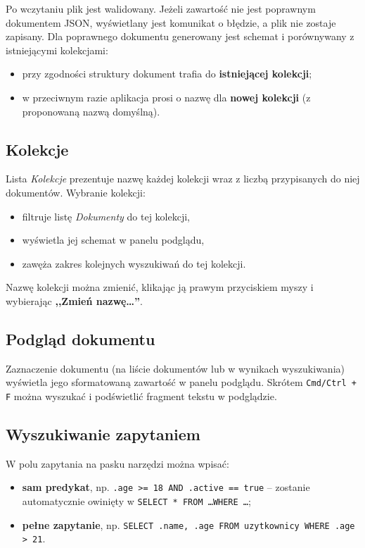 \documentclass[a4paper,12pt]{article}
\begin{document}
Po wczytaniu plik jest walidowany. Jeżeli zawartość nie jest poprawnym dokumentem JSON,
wyświetlany jest komunikat o błędzie, a plik nie zostaje zapisany. Dla poprawnego
dokumentu generowany jest schemat i porównywany z istniejącymi kolekcjami:

\begin{itemize}[noitemsep]
  \item przy zgodności struktury dokument trafia do \textbf{istniejącej kolekcji};
  \item w przeciwnym razie aplikacja prosi o nazwę dla \textbf{nowej kolekcji}
        (z proponowaną nazwą domyślną).
\end{itemize}

\subsection{Kolekcje}

Lista \emph{Kolekcje} prezentuje nazwę każdej kolekcji wraz z liczbą przypisanych do niej
dokumentów. Wybranie kolekcji:

\begin{itemize}[noitemsep]
  \item filtruje listę \emph{Dokumenty} do tej kolekcji,
  \item wyświetla jej schemat w panelu podglądu,
  \item zawęża zakres kolejnych wyszukiwań do tej kolekcji.
\end{itemize}

Nazwę kolekcji można zmienić, klikając ją prawym przyciskiem myszy i wybierając
\textbf{,,Zmień nazwę\ldots''}.

\subsection{Podgląd dokumentu}

Zaznaczenie dokumentu (na liście dokumentów lub w wynikach wyszukiwania) wyświetla jego
sformatowaną zawartość w panelu podglądu. Skrótem \texttt{Cmd/Ctrl + F} można wyszukać
i podświetlić fragment tekstu w podglądzie.

\subsection{Wyszukiwanie zapytaniem}

W polu zapytania na pasku narzędzi można wpisać:

\begin{itemize}[noitemsep]
  \item \textbf{sam predykat}, np. \texttt{.age >= 18 AND .active == true} --
        zostanie automatycznie owinięty w \texttt{SELECT * FROM \ldots WHERE \ldots};
  \item \textbf{pełne zapytanie}, np.
        \texttt{SELECT .name, .age FROM uzytkownicy WHERE .age > 21}.
\end{itemize}
\end{document}
